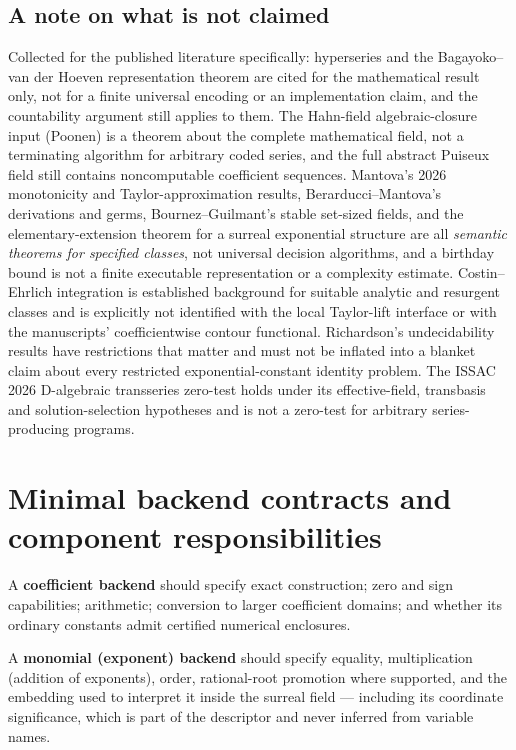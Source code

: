 \documentclass[11pt,letterpaper]{article}
\numberwithin{equation}{section}
\theoremstyle{definition}
\theoremstyle{remark}
\begin{document}
\subsection{A note on what is not claimed}
\label{cas:sec-nonclaims-note}
Collected for the published literature specifically: hyperseries and the
Bagayoko--van der Hoeven representation theorem are cited for the mathematical
result only, not for a finite universal encoding or an implementation claim, and
the countability argument still applies to them. The Hahn-field
algebraic-closure input (Poonen) is a theorem about the complete mathematical
field, not a terminating algorithm for arbitrary coded series, and the full
abstract Puiseux field still contains noncomputable coefficient sequences.
Mantova's 2026 monotonicity and Taylor-approximation results,
Berarducci--Mantova's derivations and germs, Bournez--Guilmant's stable
set-sized fields, and the elementary-extension theorem for a surreal exponential
structure are all \emph{semantic theorems for specified classes}, not universal
decision algorithms, and a birthday bound is not a finite executable
representation or a complexity estimate. Costin--Ehrlich integration is
established background for suitable analytic and resurgent classes and is
explicitly not identified with the local Taylor-lift interface or with the
manuscripts' coefficientwise contour functional. Richardson's undecidability
results have restrictions that matter and must not be inflated into a blanket
claim about every restricted exponential-constant identity problem. The ISSAC
2026 D-algebraic transseries zero-test holds under its effective-field,
transbasis and solution-selection hypotheses and is not a zero-test for
arbitrary series-producing programs.

\section{Minimal backend contracts and component responsibilities}
\label{cas:app-contracts}

A \textbf{coefficient backend} should specify exact construction; zero and sign
capabilities; arithmetic; conversion to larger coefficient domains; and whether
its ordinary constants admit certified numerical enclosures.

A \textbf{monomial (exponent) backend} should specify equality, multiplication
(addition of exponents), order, rational-root promotion where supported, and the
embedding used to interpret it inside the surreal field --- including its
coordinate significance, which is part of the descriptor and never inferred from
variable names.
\end{document}
